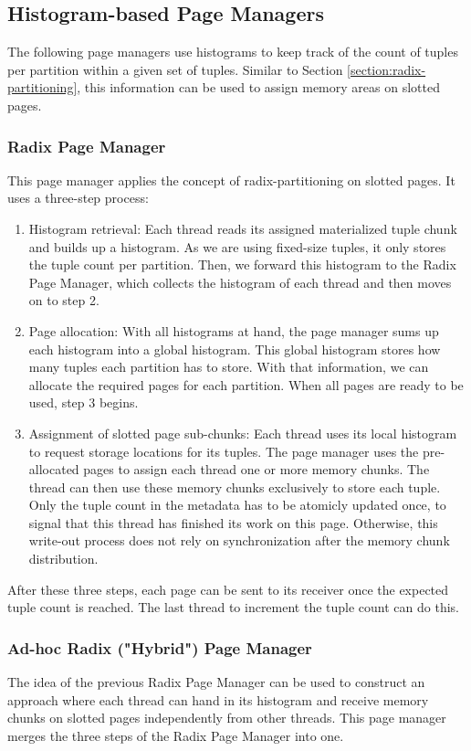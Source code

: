 \subsection{Histogram-based Page Managers}
The following page managers use histograms to keep track of the count of tuples per partition within a given set of tuples.
Similar to Section \ref{section:radix-partitioning}, this information can be used to assign memory areas on slotted pages.
\subsubsection{Radix Page Manager} \label{subsubsection-Radix-Page-Manager}
This page manager applies the concept of radix-partitioning on slotted pages.
It uses a three-step process:
\begin{enumerate}
  \item Histogram retrieval: Each thread reads its assigned materialized tuple chunk and
        builds up a histogram.
        As we are using fixed-size tuples, it only stores the tuple count per partition.
        Then, we forward this histogram to the Radix Page Manager, which collects the histogram of each thread and then moves on to step 2.

  \item Page allocation: With all histograms at hand, the page manager sums up each
        histogram into a global histogram.
        This global histogram stores how many tuples each partition has to store.
        With that information, we can allocate the required pages for each partition.
        When all pages are ready to be used, step 3 begins.

  \item  Assignment of slotted page sub-chunks: Each thread uses its local histogram to
        request storage locations for its tuples.
        The page manager uses the pre-allocated pages to assign each thread one or more memory chunks.
        The thread can then use these memory chunks exclusively to store each tuple.
        Only the tuple count in the metadata has to be atomicly updated once, to signal that this thread has finished its work on this page.
        Otherwise, this write-out process does not rely on synchronization after the memory chunk distribution.
\end{enumerate}
After these three steps, each page can be sent to its receiver once the expected tuple count is reached.
The last thread to increment the tuple count can do this.

\subsubsection{Ad-hoc Radix ("Hybrid") Page Manager} \label{subsubsection-Ad-hoc-Radix-Page-Manager}
The idea of the previous Radix Page Manager can be used to construct an approach where each thread can hand in its histogram and receive memory chunks on slotted pages independently from other threads.
This page manager merges the three steps of the Radix Page Manager into one.

